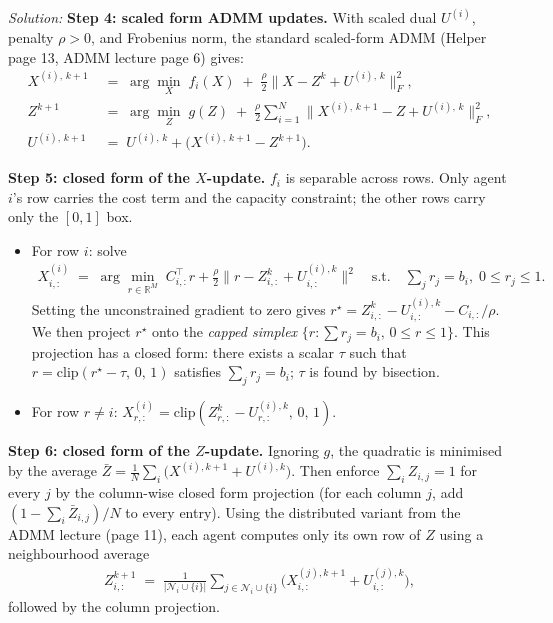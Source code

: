 \documentclass[a4paper, 11pt]{article}
\newenvironment{solution}
    {\textit{Solution:}}
    {}
\begin{document}
\begin{solution}
\textbf{Step 4: scaled form ADMM updates.} With scaled dual $U^{(i)}$, penalty $\rho > 0$, and Frobenius norm, the standard scaled-form ADMM (Helper page 13, ADMM lecture page 6) gives:
\begin{align*}
    X^{(i),\, k+1} &\;=\; \arg\min_X \; f_i(X) \;+\; \tfrac{\rho}{2} \big\| X - Z^k + U^{(i),\,k} \big\|_F^2, \\
    Z^{k+1} &\;=\; \arg\min_Z \; g(Z) \;+\; \tfrac{\rho}{2} \sum_{i=1}^{N} \big\| X^{(i),\,k+1} - Z + U^{(i),\,k} \big\|_F^2, \\
    U^{(i),\, k+1} &\;=\; U^{(i),\,k} + \big(X^{(i),\,k+1} - Z^{k+1}\big).
\end{align*}

\textbf{Step 5: closed form of the $X$-update.} $f_i$ is separable across rows. Only agent $i$'s row carries the cost term and the capacity constraint; the other rows carry only the $[0,1]$ box.
\begin{itemize}[nosep]
    \item For row $i$: solve
    \begin{align*}
        X^{(i)}_{i,:} \;=\; \arg\min_{r \in \mathbb{R}^M} \; C_{i,:}^\top r + \tfrac{\rho}{2} \big\| r - Z^k_{i,:} + U^{(i),k}_{i,:} \big\|^2 \quad \text{s.t.} \quad \textstyle\sum_j r_j = b_i, \; 0 \le r_j \le 1.
    \end{align*}
    Setting the unconstrained gradient to zero gives $r^{\star} = Z^k_{i,:} - U^{(i),k}_{i,:} - C_{i,:}/\rho$. We then project $r^{\star}$ onto the \emph{capped simplex} $\{r : \sum r_j = b_i,\, 0 \le r \le 1\}$. This projection has a closed form: there exists a scalar $\tau$ such that
    $r = \mathrm{clip}(r^{\star} - \tau,\, 0,\, 1)$ satisfies $\sum_j r_j = b_i$; $\tau$ is found by bisection.
    \item For row $r \ne i$: $X^{(i)}_{r,:} = \mathrm{clip}(Z^k_{r,:} - U^{(i),k}_{r,:},\, 0,\, 1)$.
\end{itemize}

\textbf{Step 6: closed form of the $Z$-update.} Ignoring $g$, the quadratic is minimised by the average $\bar Z = \tfrac{1}{N} \sum_i \big(X^{(i),k+1} + U^{(i),k}\big)$. Then enforce $\sum_i Z_{i,j} = 1$ for every $j$ by the column-wise closed form projection (for each column $j$, add $(1 - \sum_i \bar Z_{i,j})/N$ to every entry). Using the distributed variant from the ADMM lecture (page 11), each agent computes only its own row of $Z$ using a neighbourhood average
\begin{align*}
    Z^{k+1}_{i,:} \;=\; \frac{1}{\big|\mathcal{N}_i \cup \{i\}\big|} \sum_{j \in \mathcal{N}_i \cup \{i\}} \Big(X^{(j),k+1}_{i,:} + U^{(j),k}_{i,:}\Big),
\end{align*}
followed by the column projection.


\end{solution}
\end{document}
